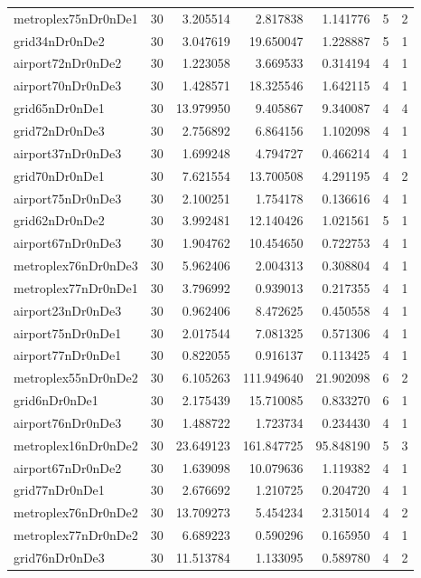 \documentclass[../../../thesis.tex]{subfiles}
\begin{document}
\begin{longtable}{|l|r|r|r|r|r|r|}
metroplex75nDr0nDe1 & 30 & 3.205514 & 2.817838 & 1.141776 & 5 & 2 \\
grid34nDr0nDe2 & 30 & 3.047619 & 19.650047 & 1.228887 & 5 & 1 \\
airport72nDr0nDe2 & 30 & 1.223058 & 3.669533 & 0.314194 & 4 & 1 \\
airport70nDr0nDe3 & 30 & 1.428571 & 18.325546 & 1.642115 & 4 & 1 \\
grid65nDr0nDe1 & 30 & 13.979950 & 9.405867 & 9.340087 & 4 & 4 \\
grid72nDr0nDe3 & 30 & 2.756892 & 6.864156 & 1.102098 & 4 & 1 \\
airport37nDr0nDe3 & 30 & 1.699248 & 4.794727 & 0.466214 & 4 & 1 \\
grid70nDr0nDe1 & 30 & 7.621554 & 13.700508 & 4.291195 & 4 & 2 \\
airport75nDr0nDe3 & 30 & 2.100251 & 1.754178 & 0.136616 & 4 & 1 \\
grid62nDr0nDe2 & 30 & 3.992481 & 12.140426 & 1.021561 & 5 & 1 \\
airport67nDr0nDe3 & 30 & 1.904762 & 10.454650 & 0.722753 & 4 & 1 \\
metroplex76nDr0nDe3 & 30 & 5.962406 & 2.004313 & 0.308804 & 4 & 1 \\
metroplex77nDr0nDe1 & 30 & 3.796992 & 0.939013 & 0.217355 & 4 & 1 \\
airport23nDr0nDe3 & 30 & 0.962406 & 8.472625 & 0.450558 & 4 & 1 \\
airport75nDr0nDe1 & 30 & 2.017544 & 7.081325 & 0.571306 & 4 & 1 \\
airport77nDr0nDe1 & 30 & 0.822055 & 0.916137 & 0.113425 & 4 & 1 \\
metroplex55nDr0nDe2 & 30 & 6.105263 & 111.949640 & 21.902098 & 6 & 2 \\
grid6nDr0nDe1 & 30 & 2.175439 & 15.710085 & 0.833270 & 6 & 1 \\
airport76nDr0nDe3 & 30 & 1.488722 & 1.723734 & 0.234430 & 4 & 1 \\
metroplex16nDr0nDe2 & 30 & 23.649123 & 161.847725 & 95.848190 & 5 & 3 \\
airport67nDr0nDe2 & 30 & 1.639098 & 10.079636 & 1.119382 & 4 & 1 \\
grid77nDr0nDe1 & 30 & 2.676692 & 1.210725 & 0.204720 & 4 & 1 \\
metroplex76nDr0nDe2 & 30 & 13.709273 & 5.454234 & 2.315014 & 4 & 2 \\
metroplex77nDr0nDe2 & 30 & 6.689223 & 0.590296 & 0.165950 & 4 & 1 \\
grid76nDr0nDe3 & 30 & 11.513784 & 1.133095 & 0.589780 & 4 & 2 \\

\end{longtable}
\end{document}
